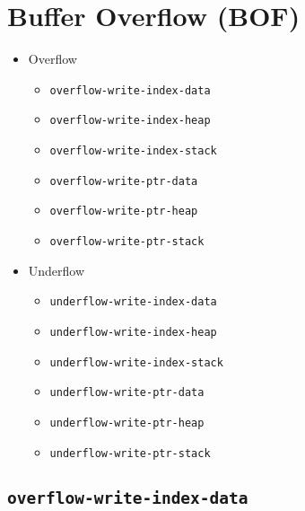 \documentclass[a4paper]{book}
\begin{document}
\section{Buffer Overflow (BOF)}
\begin{itemize}[noitemsep]

\item Overflow
 \begin{itemize}[noitemsep, nolistsep, leftmargin=1em]
    \item[\ref{test-overflow-write-index-data}]       \texttt{overflow-write-index-data}
    \item[\ref{test-overflow-write-index-heap}]       \texttt{overflow-write-index-heap}
    \item[\ref{test-overflow-write-index-stack}]      \texttt{overflow-write-index-stack}
    \item[\ref{test-overflow-write-ptr-data}]         \texttt{overflow-write-ptr-data}
    \item[\ref{test-overflow-write-ptr-heap}]         \texttt{overflow-write-ptr-heap}
    \item[\ref{test-overflow-write-ptr-stack}]        \texttt{overflow-write-ptr-stack}
 \end{itemize}

\item Underflow
 \begin{itemize}[noitemsep, nolistsep, leftmargin=1em]
    \item[\ref{test-underflow-write-index-data}]      \texttt{underflow-write-index-data}
    \item[\ref{test-underflow-write-index-heap}]      \texttt{underflow-write-index-heap}
    \item[\ref{test-underflow-write-index-stack}]     \texttt{underflow-write-index-stack}
    \item[\ref{test-underflow-write-ptr-data}]        \texttt{underflow-write-ptr-data}
    \item[\ref{test-underflow-write-ptr-heap}]        \texttt{underflow-write-ptr-heap}
    \item[\ref{test-underflow-write-ptr-stack}]       \texttt{underflow-write-ptr-stack}
 \end{itemize}

\end{itemize}

\newpage

\subsection{\texttt{overflow-write-index-data}}\label{test-overflow-write-index-data}
\end{document}
